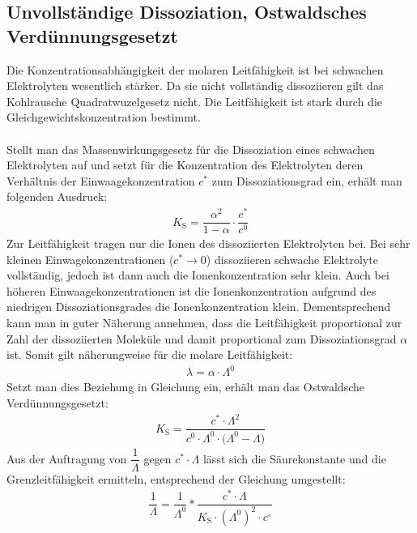 \documentclass[12pt,a4paper,titlepage,headinclude,bibtotoc]{scrartcl}
\begin{document}
\subsection{Unvollständige Dissoziation, Ostwaldsches Verdünnungsgesetzt}
Die Konzentrationsabhängigkeit der molaren Leitfähigkeit ist bei schwachen Elektrolyten wesentlich stärker. Da sie nicht vollständig dissoziieren gilt das Kohlrausche Quadratwuzelgesetz nicht. Die Leitfähigkeit ist stark durch die Gleichgewichtskonzentration bestimmt.\\\\
Stellt man das Massenwirkungsgesetz für die Dissoziation eines schwachen Elektrolyten auf und setzt für die Konzentration des Elektrolyten deren Verhältnis der Einwaagekonzentration $c^*$ zum Dissoziationsgrad ein, erhält man folgenden Ausdruck:
\begin{align}
K_\mathrm{S} = \dfrac{\alpha ^2}{1-\alpha } \cdot \dfrac{c^*}{c^0}
\end{align}
Zur Leitfähigkeit tragen nur die Ionen des dissoziierten Elektrolyten bei. Bei sehr kleinen Einwagekonzentrationen ($c^* \rightarrow 0$) dissoziieren schwache Elektrolyte vollständig, jedoch ist dann auch die Ionenkonzentration sehr klein. Auch bei höheren Einwaagekonzentrationen ist die Ionenkonzentration aufgrund des niedrigen Dissoziationsgrades die Ionenkonzentration klein. Dementsprechend kann man in guter Näherung annehmen, dass die Leitfähigkeit proportional zur Zahl der dissoziierten Moleküle und damit proportional zum Dissoziationsgrad $\alpha$ ist. Somit gilt näherungweise für die molare Leitfähigkeit:
\begin{align}
\lambda = \alpha \cdot \mathit{\Lambda} ^0 
\end{align}    
Setzt man dies Beziehung in Gleichung ein, erhält man das Ostwaldsche Verdünnungsgesetzt:
\begin{align}
K_\mathrm{S} = \dfrac{c^* \cdot \mathit{\Lambda ^2}}{c^0 \cdot \mathit{\Lambda ^0} \cdot (\mathit{\Lambda ^0} - \mathit{\Lambda)}}
\end{align} 
 Aus der Auftragung von $\dfrac{1}{\mathit{\Lambda}}$ gegen $c^* \cdot \mathit{\Lambda}$ lässt sich die Säurekonstante und die Grenzleitfähigkeit ermitteln, entsprechend der Gleichung umgestellt:
\begin{align}
\dfrac{1}{\mathit{\Lambda}} = \dfrac{1}{\mathit{\Lambda ^0}} * \dfrac{c^* \cdot \mathit{\Lambda }}{K_\mathrm{S} \cdot (\mathit{\Lambda ^0})^2 \cdot c^\circ}
\end{align}
\end{document}
